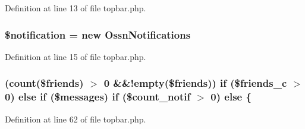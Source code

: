 Definition at line 13 of file topbar.\+php.

\subsubsection[{\texorpdfstring{\$notification}{$notification}}]{\setlength{\rightskip}{0pt plus 5cm}\$notification = new {\bf Ossn\+Notifications}}\hypertarget{components_2_ossn_notifications_2plugins_2default_2notifications_2page_2topbar_8php_a31b24031fc7fcaa7848766b56934949b}{}\label{components_2_ossn_notifications_2plugins_2default_2notifications_2page_2topbar_8php_a31b24031fc7fcaa7848766b56934949b}


Definition at line 15 of file topbar.\+php.

\subsubsection[{\texorpdfstring{else}{else}}]{ ({\bf count}(\$friends) $>$ 0 \&\&!empty(\$friends)) {\bf if} (\$friends\+\_\+c $>$ 0) else {\bf if} (\$messages) {\bf if} (\$count\+\_\+notif $>$ 0) else \{}\hypertarget{components_2_ossn_notifications_2plugins_2default_2notifications_2page_2topbar_8php_a2995dfffcf30766221327de483a8ee5c}{}\label{components_2_ossn_notifications_2plugins_2default_2notifications_2page_2topbar_8php_a2995dfffcf30766221327de483a8ee5c}


Definition at line 62 of file topbar.\+php.

